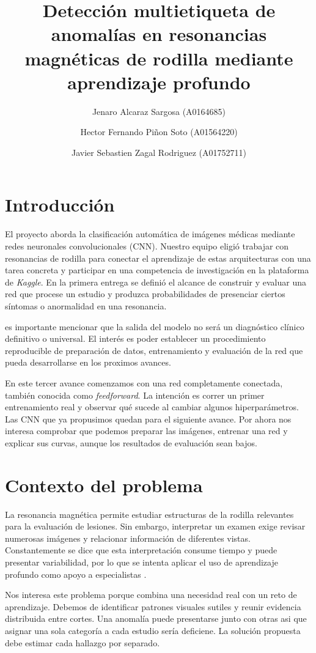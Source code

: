 \documentclass[eng]{ajceam-class}
\title{Detección multietiqueta de anomalías en resonancias magnéticas de rodilla mediante aprendizaje profundo}
\author[1]{Jenaro Alcaraz Sargosa (A0164685)}
\author[2]{Hector Fernando Piñon Soto (A01564220)}
\author[3]{Javier Sebastien Zagal Rodriguez (A01752711)}
\affil[1]{Instituto Tecnológico de Estudios Superiores de Monterrey (ITESM), Departamento de Ingeniería y Ciencias, Nuevo Leon, México}
\begin{document}
\maketitle
\thispagestyle{fancy}


\section{Introducción}

El proyecto aborda la clasificación automática de imágenes médicas mediante redes neuronales convolucionales (CNN). Nuestro equipo eligió trabajar con resonancias de rodilla para conectar el aprendizaje de estas arquitecturas con una tarea concreta y participar en una competencia de investigación en la plataforma de \textit{Kaggle}. En la primera entrega se definió el alcance de construir y evaluar una red que procese un estudio y produzca probabilidades de presenciar ciertos síntomas o anormalidad en una resonancia.

es importante mencionar que la salida del modelo no será un diagnóstico clínico definitivo o universal. El interés es poder establecer un procedimiento reproducible de preparación de datos, entrenamiento y evaluación de la red que pueda desarrollarse en los proximos avances.

En este tercer avance comenzamos con una red completamente conectada, también conocida como \textit{feedforward}. La intención es correr un primer entrenamiento real y observar qué sucede al cambiar algunos hiperparámetros. Las CNN que ya propusimos quedan para el siguiente avance. Por ahora nos interesa comprobar que podemos preparar las imágenes, entrenar una red y explicar sus curvas, aunque los resultados de evaluación sean bajos.

\section{Contexto del problema}

La resonancia magnética permite estudiar estructuras de la rodilla relevantes para la evaluación de lesiones. Sin embargo, interpretar un examen exige revisar numerosas imágenes y relacionar información de diferentes vistas. Constantemente se dice que esta interpretación consume tiempo y puede presentar variabilidad, por lo que se intenta aplicar el uso de aprendizaje profundo como apoyo a especialistas \cite{bien2018}.

Nos interesa este problema porque combina una necesidad real con un reto de aprendizaje. Debemos de identificar patrones visuales sutiles y reunir evidencia distribuida entre cortes. Una anomalía puede presentarse junto con otras asi que asignar una sola categoría a cada estudio sería deficiene. La solución propuesta debe estimar cada hallazgo por separado.
\end{document}
